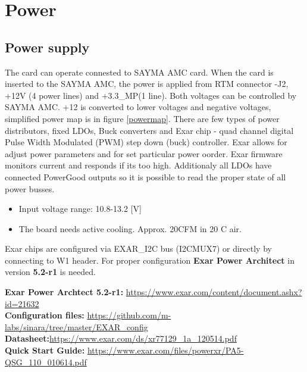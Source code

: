 \section{Power}
\subsection{Power supply}
The card can operate connested to SAYMA AMC card. When the card is inserted to the SAYMA AMC,  the power is applied from RTM connector -J2, +12V (4 power lines) and +3.3\_MP(1 line). Both voltages can be controlled by SAYMA AMC.
+12 is converted to lower voltages and negative voltages, simplified power map is in figure \ref{powermap}. There are few types of power distributors, fixed LDOs, Buck converters and Exar chip - quad channel digital Pulse Width Modulated (PWM) step down (buck) controller. Exar allows for adjust power parameters and for set particular power oorder. Exar firmware monitors current and responds if its too high.  Additionaly all LDOs have connected PowerGood outputs so it is possible to read the proper state of all power busses. 




%

\begin{itemize}
 

\item Input voltage range: 10.8-13.2 [V]\\
\item The board needs active cooling. Approx. 20CFM in 20 C air.\\

\end{itemize}

Exar chips are configured via EXAR\_I2C bus (I2CMUX7) or directly by connecting to W1 
header. For proper configuration \textbf{Exar Power Architect} in version \textbf{5.2-r1} is needed.

\noindent
\textbf{Exar Power Archtect 5.2-r1:}
\href{https://www.exar.com/content/document.ashx?id=21632}{https://www.exar.com/content/document.ashx?id=21632}\\
\textbf{Configuration files:}
\href{https://github.com/m-labs/sinara/tree/master/EXAR\_config}{https://github.com/m-labs/sinara/tree/master/EXAR\_config}\\
\textbf{Datasheet:}\href{https://www.exar.com/ds/xr77129_1a_120514.pdf}{https://www.exar.com/ds/xr77129\_1a\_120514.pdf}\\
\textbf{Quick Start Guide:} \href{https://www.exar.com/files/powerxr/PA5-QSG_110_010614.pdf}{https://www.exar.com/files/powerxr/PA5-QSG\_110\_010614.pdf}\\


